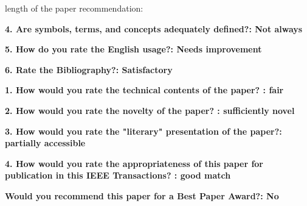 \documentclass[12pt]{article}
\begin{document}
length of the paper recommendation:

\textbf{4. Are symbols, terms, and concepts adequately defined?: Not always}

\textbf{5. How do you rate the English usage?: Needs improvement}

\textbf{6. Rate the Bibliography?: Satisfactory}

\textbf{1. How would you rate the technical contents of the paper? : fair}

\textbf{2. How would you rate the novelty of the paper? : sufficiently novel}

\textbf{3. How would you rate the "literary" presentation of the paper?: partially accessible}

\textbf{4. How would you rate the appropriateness of this paper for publication in this IEEE Transactions? : good match}

\textbf{Would you recommend this paper for a Best Paper Award?: No}
\end{document}

